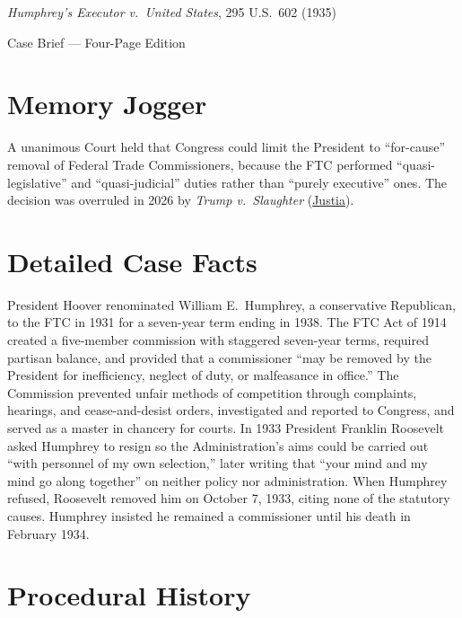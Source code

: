 \documentclass[12pt]{article}
\begin{document}
\begin{center}
{\LARGE \textit{Humphrey's Executor v.\ United States}, 295 U.S.\ 602 (1935)\par}
\vspace{0.8em}
{\large Case Brief --- Four-Page Edition\par}
\end{center}
\vspace{1em}

\section{Memory Jogger}

A unanimous Court held that Congress could limit the President to ``for-cause'' removal of Federal Trade Commissioners, because the FTC performed ``quasi-legislative'' and ``quasi-judicial'' duties rather than ``purely executive'' ones. The decision was overruled in 2026 by \textit{Trump v.\ Slaughter} (\href{https://supreme.justia.com/cases/federal/us/295/602/}{Justia}).

\section{Detailed Case Facts}

President Hoover renominated William E.\ Humphrey, a conservative Republican, to the FTC in 1931 for a seven-year term ending in 1938. The FTC Act of 1914 created a five-member commission with staggered seven-year terms, required partisan balance, and provided that a commissioner ``may be removed by the President for inefficiency, neglect of duty, or malfeasance in office.'' The Commission prevented unfair methods of competition through complaints, hearings, and cease-and-desist orders, investigated and reported to Congress, and served as a master in chancery for courts. In 1933 President Franklin Roosevelt asked Humphrey to resign so the Administration's aims could be carried out ``with personnel of my own selection,'' later writing that ``your mind and my mind go along together'' on neither policy nor administration. When Humphrey refused, Roosevelt removed him on October 7, 1933, citing none of the statutory causes. Humphrey insisted he remained a commissioner until his death in February 1934.

\section{Procedural History}
\end{document}
